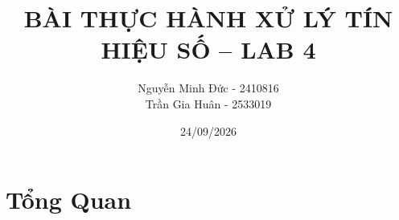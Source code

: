 \documentclass[12pt]{article}
\title{BÀI THỰC HÀNH XỬ LÝ TÍN HIỆU SỐ -- LAB 4}
\author{Nguyễn Minh Đức - 2410816 \\ Trần Gia Huân - 2533019}
\date{24/09/2026}
\begin{document}
\maketitle
\thispagestyle{fancy}

\section*{Tổng Quan}







\end{document}
